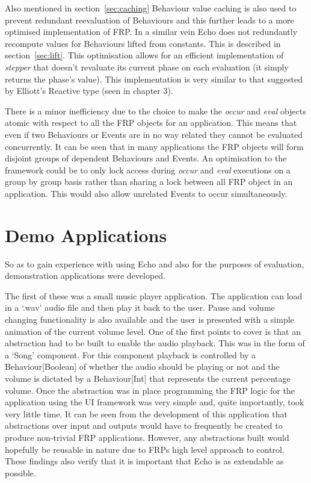     Also mentioned in section~\ref{sec:caching} Behaviour value caching is also used to prevent redundant reevaluation of 
    Behaviours
    and this further leads to a more optimised implementation of FRP. In a similar vein Echo does not redundantly recompute
    values for Behaviours lifted from constants. This is described in section~\ref{sec:lift}. This optimisation 
    allows for an efficient implementation of \emph{stepper} that
    doesn't revaluate its current phase on each evaluation (it simply returns the phase's value). This implementation is
    very similar to that suggested by Elliott's Reactive type (seen in chapter 3).
    
    There is a minor inefficiency due to the choice to make the \emph{occur} and \emph{eval} objects atomic
    with respect to all the FRP objects for an application. This means that even if two Behaviours or Events are in no way
    related they cannot be evaluated concurrently. It can be seen that in many applications the FRP objects will
    form disjoint groups of dependent Behaviours and Events. An optimisation to the framework could be to
    only lock access during \emph{occur} and \emph{eval} executions on a group by group basis rather than sharing
    a lock between all FRP object in an application. This would also allow unrelated Events to occur simultaneously.
  
  \section{Demo Applications}
    So as to gain experience with using Echo and also for the purposes of evaluation, demonstration
    applications were developed. 
    
    The first of these was a small music player application. The application
    can load in a `.wav' audio file and then play it back to the user. Pause and volume changing functionality
    is also available and the user is presented with a simple animation of the current volume level. One of the
    first points to cover is that an abstraction had to be built to enable the audio playback. This was in the form
    of a `Song' component. For this component playback is controlled by a Behaviour[Boolean] of whether the audio
    should be playing or not and the volume is dictated by a Behaviour[Int] that represents the current percentage
    volume. Once the abstraction was in place programming the FRP logic for the application using the 
    UI framework was very simple and, quite importantly, took very little time. It can be seen from
    the development of this application that abstractions over input and outputs would have to frequently be
    created to produce non-trivial FRP applications. However, any abstractions built would hopefully be
    reusable in nature due to FRPs high level approach to control. These findings also verify that it
    is important that Echo is as extendable as possible.
    

